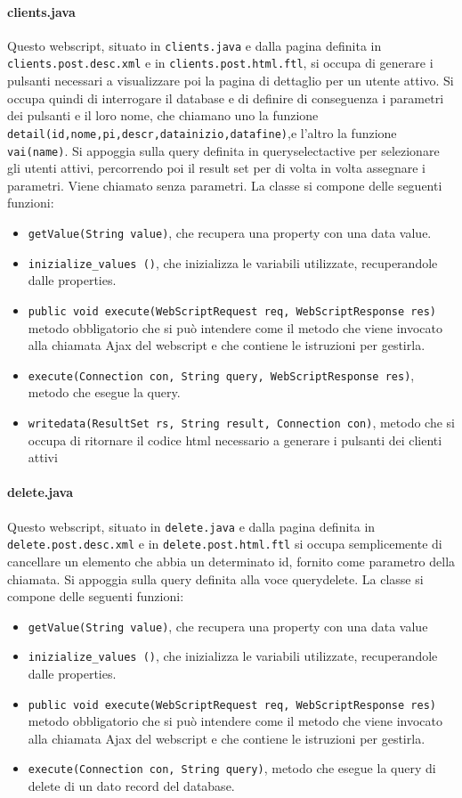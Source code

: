 \paragraph{clients.java}
Questo webscript, situato in \texttt{clients.java} e dalla pagina definita in \texttt{clients.post.desc.xml} e in \texttt{clients.post.html.ftl}, si occupa di generare i pulsanti necessari a visualizzare poi la pagina di dettaglio per un utente attivo. Si occupa quindi di interrogare il database e di definire di conseguenza i parametri dei pulsanti e il loro nome, che chiamano uno la funzione \texttt{detail(id,nome,pi,descr,datainizio,datafine)},e l’altro la funzione \texttt{vai(name)}. Si appoggia sulla query definita in queryselectactive per selezionare gli utenti attivi, percorrendo poi il result set per di volta in volta assegnare i parametri.
Viene chiamato senza parametri.
La classe si compone delle seguenti funzioni:
\begin{itemize}
\item \texttt{getValue(String value)}, che recupera una property con una data value.
\item \texttt{inizialize\_values ()}, che inizializza le variabili utilizzate, recuperandole dalle properties.
\item \texttt{public void execute(WebScriptRequest req, WebScriptResponse res)} metodo obbligatorio che si può intendere come il metodo che viene invocato alla chiamata Ajax del webscript e che contiene le istruzioni per gestirla.
\item \texttt{execute(Connection con, String query, WebScriptResponse res)}, metodo che esegue la query.
\item \texttt{writedata(ResultSet rs, String result, Connection con)}, metodo che si occupa di ritornare il codice html necessario a generare i pulsanti dei clienti attivi
\end{itemize}
\paragraph{delete.java}
Questo webscript, situato in \texttt{delete.java} e dalla pagina definita in \texttt{delete.post.desc.xml} e in \texttt{delete.post.html.ftl}  si occupa semplicemente di cancellare un elemento che abbia un determinato id, fornito come parametro della chiamata. Si appoggia sulla query definita alla voce querydelete.
La classe si compone delle seguenti funzioni:
\begin{itemize}
\item \texttt{getValue(String value)}, che recupera una property con una data value
\item \texttt{inizialize\_values ()}, che inizializza le variabili utilizzate, recuperandole dalle properties.
\item \texttt{public void execute(WebScriptRequest req, WebScriptResponse res)} metodo obbligatorio che si può intendere come il metodo che viene invocato alla chiamata Ajax del webscript e che contiene le istruzioni per gestirla.
\item \texttt{execute(Connection con, String query)}, metodo che esegue la query di delete di un dato record del database.
\end{itemize}
